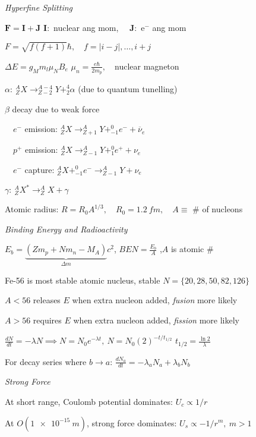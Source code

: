 \documentclass[twocolumn]{article}
\begin{document}
\textit{Hyperfine Splitting}

$\mathbf{F} = \mathbf{I} + \mathbf{J}$ \hfill $\mathbf{I}:$ nuclear ang mom,$\quad$ $\mathbf{J}:$ e$^-$ ang mom

$F = \sqrt{f(f+1)} \hbar,\quad f = |i-j|, \dots, i+j$

$\Delta E = g_M m_l \mu_N B_e$ \hfill $\mu_n = \frac{e\hbar}{2m_p}, \quad$nuclear magneton


\newpage


$\alpha:\ ^A_Z X \to^{A-4}_{Z-2} Y + ^4_2\alpha$ (due to quantum tunelling)

$\beta$ decay due to weak force

$\quad e^{-}$ emission: $^A_Z X \to ^A_{Z+1} Y + ^0_{-1} e^- + \overline{\nu}_e$

$\quad p^+$ emission: $^A_Z X \to ^A_{Z-1} Y + ^0_{1} e^+ + \nu_e$

$\quad e^-$ capture: $^A_Z X + ^0_{-1} e^- \to ^A_{Z-1} Y + \nu_e$

$\gamma:\ ^A_Z X^* \to ^A_Z X + \gamma$

Atomic radius: $R = R_0 A^{1/3}, \quad R_0 = \SI{1.2}{fm}, \quad A \equiv$ \# of nucleons

\vspace{-.5em}
\dotfill

\textit{Binding Energy and Radioactivity}

$E_b = \underbrace{(Z m_p + N m_n - M_A)}_{\Delta m} c^2$, \hfill $BEN = \frac{E_b}{A}$ ,\hfill $A$ is atomic \#

Fe-56 is most stable atomic nucleus, \hfill stable $N = \{ 20, 28, 50, 82, 126 \}$

$A < 56$ releases $E$ when extra nucleon added, \textit{fusion} more likely

$A > 56$ requires $E$ when extra nucleon added, \textit{fission} more likely

$\frac{dN}{dt} = -\lambda N \implies N = N_0 e^{-\lambda t},\ N = N_0 (2)^{-t/t_{1/2}}$ \hfill $t_{1/2} = \frac{\ln 2}{\lambda}$

For decay series where $b \to a$: $\frac{dN_a}{dt} = -\lambda_a N_a + \lambda_b N_b$

\vspace{-.5em}
\dotfill

\textit{Strong Force}

At short range, Coulomb potential dominates: $U_c \propto 1/r$

At $O(\SI{1e-15}{m})$, strong force dominates: $U_s \propto -1/r^m,\ m > 1$
\end{document}
